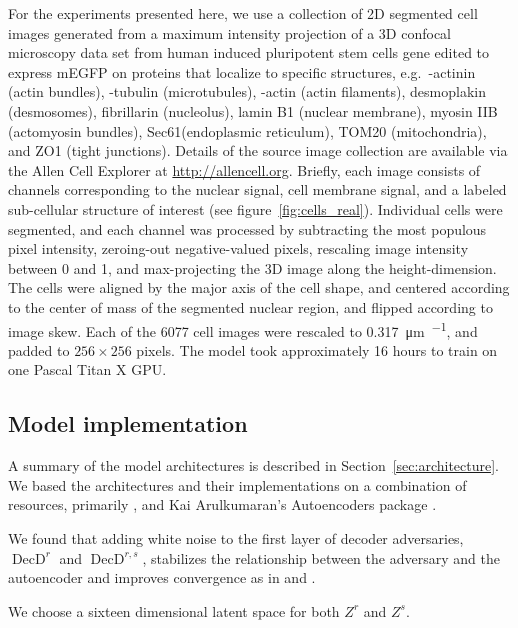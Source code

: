 \documentclass[accepted]{article}
\DeclareMathOperator{\DecD}{DecD}
\begin{document}
For the experiments presented here, we use a collection of 2D segmented cell images generated from a maximum intensity projection of a 3D confocal microscopy data set from human induced pluripotent stem cells gene edited to express mEGFP on proteins that localize to specific structures, e.g.\ \textalpha-actinin (actin bundles), \textalpha-tubulin (microtubules), \textbeta-actin (actin filaments), desmoplakin (desmosomes), fibrillarin (nucleolus), lamin B1 (nuclear membrane), myosin IIB (actomyosin bundles), Sec61\textbeta (endoplasmic reticulum), TOM20 (mitochondria), and ZO1 (tight junctions).
Details of the source image collection are available via the Allen Cell Explorer at \url{http://allencell.org}.
Briefly, each image consists of channels corresponding to the nuclear signal, cell membrane signal, and a labeled sub-cellular structure of interest (see figure~\ref{fig:cells_real}).
Individual cells were  segmented, and each channel was processed by subtracting the most populous pixel intensity, zeroing-out negative-valued pixels, rescaling image intensity between 0 and 1, and max-projecting the 3D image along the height-dimension.
The cells were aligned by the major axis of the cell shape, and centered according to the center of mass of the segmented nuclear region, and flipped according to image skew.
Each of the 6077 cell images were rescaled to \SI{0.317}{\micro\metre\per\px}, and padded to $256 \times 256$ pixels.
The model took approximately 16 hours to train on one Pascal Titan X GPU.

\subsection{Model implementation}

A summary of the model architectures is described in Section~\ref{sec:architecture}.
We based the architectures and their implementations on a combination of resources, primarily \cite{Larsen:2015vi, Makhzani:2015tm, Radford:2015wf}, and Kai Arulkumaran's Autoencoders package \cite{Arulkumaran:2017}.

We found that adding white noise to the first layer of decoder adversaries, $\DecD^r$ and $\DecD^{r,s}$, stabilizes the relationship between the adversary and the autoencoder and improves convergence as in \cite{Sonderby:2016ta} and \cite{Salimans:2016wg}.

We choose a sixteen dimensional latent space for both  $Z^r$ and $Z^s$.
\end{document}
